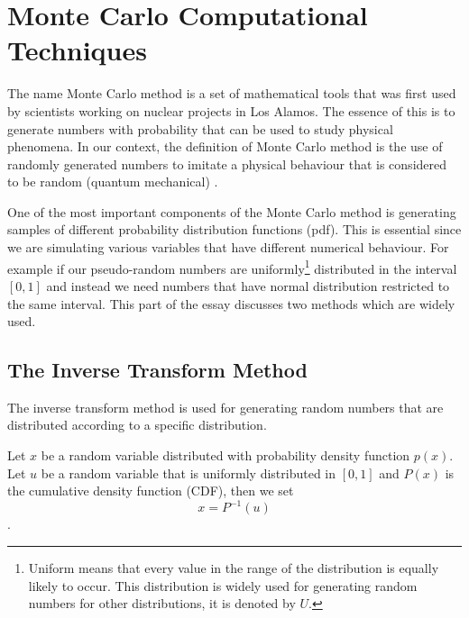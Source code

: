 \chapter{Monte Carlo Computational Techniques}

The name Monte Carlo method is a set of mathematical tools that was first used by scientists working on nuclear projects in Los Alamos.
The essence of this is to generate numbers with probability that can be used to study physical phenomena. In our context, the definition of Monte Carlo method is the use of randomly generated numbers to imitate a physical behaviour that is considered to be random (quantum mechanical) \citep{montecarlo}.


One of the most important components of the Monte Carlo method is generating samples of different probability distribution functions (pdf). This is essential since we are simulating various variables that have different numerical behaviour. For example if our pseudo-random numbers are uniformly\footnote{Uniform means that every value in the range of the distribution is equally likely to occur. This distribution is widely used for generating random numbers for other distributions, it is denoted by $U$.} distributed in the interval $[0,1]$  and instead we need numbers that have normal distribution restricted to the same interval.
This part of the essay  discusses two methods which are widely used.


\section{The Inverse Transform Method}

The inverse transform method is used for generating random numbers that are distributed according to a specific distribution. 


Let $x$ be a random variable distributed with probability density function $p(x)$. Let $u$ be a random variable that is uniformly distributed in $[0,1]$ and $P(x)$ is the cumulative density function (CDF),
then we set 
\begin{equation}
x = P^{-1} (u)
\end{equation}\citep{Weinzierl}.


